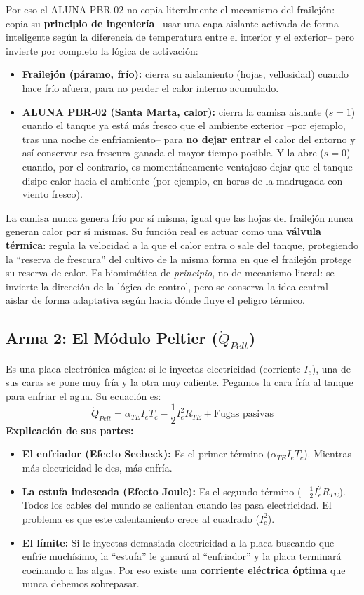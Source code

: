 \documentclass[11pt,a4paper]{article}
\begin{document}
Por eso el ALUNA PBR-02 no copia literalmente el mecanismo del frailejón: copia su \textbf{principio de ingeniería} --usar una capa aislante activada de forma inteligente según la diferencia de temperatura entre el interior y el exterior-- pero invierte por completo la lógica de activación:
\begin{itemize}
    \item \textbf{Frailejón (páramo, frío):} cierra su aislamiento (hojas, vellosidad) cuando hace frío afuera, para no perder el calor interno acumulado.
    \item \textbf{ALUNA PBR-02 (Santa Marta, calor):} cierra la camisa aislante ($s=1$) cuando el tanque ya está más fresco que el ambiente exterior --por ejemplo, tras una noche de enfriamiento-- para \textbf{no dejar entrar} el calor del entorno y así conservar esa frescura ganada el mayor tiempo posible. Y la abre ($s=0$) cuando, por el contrario, es momentáneamente ventajoso dejar que el tanque disipe calor hacia el ambiente (por ejemplo, en horas de la madrugada con viento fresco).
\end{itemize}
La camisa nunca genera frío por sí misma, igual que las hojas del frailejón nunca generan calor por sí mismas. Su función real es actuar como una \textbf{válvula térmica}: regula la velocidad a la que el calor entra o sale del tanque, protegiendo la ``reserva de frescura'' del cultivo de la misma forma en que el frailejón protege su reserva de calor. Es biomimética de \textit{principio}, no de mecanismo literal: se invierte la dirección de la lógica de control, pero se conserva la idea central --aislar de forma adaptativa según hacia dónde fluye el peligro térmico.

\subsection{Arma 2: El Módulo Peltier ($\dot{Q}_{Pelt}$)}
Es una placa electrónica mágica: si le inyectas electricidad (corriente $I_e$), una de sus caras se pone muy fría y la otra muy caliente. Pegamos la cara fría al tanque para enfriar el agua. Su ecuación es:
\begin{equation}
\dot{Q}_{Pelt} = \alpha_{TE} I_e T_c - \frac{1}{2} I_e^2 R_{TE} + \text{Fugas pasivas}
\end{equation}
\textbf{Explicación de sus partes:}
\begin{itemize}
    \item \textbf{El enfriador (Efecto Seebeck):} Es el primer término ($\alpha_{TE} I_e T_c$). Mientras más electricidad le des, más enfría.
    \item \textbf{La estufa indeseada (Efecto Joule):} Es el segundo término ($- \frac{1}{2} I_e^2 R_{TE}$). Todos los cables del mundo se calientan cuando les pasa electricidad. El problema es que este calentamiento crece al cuadrado ($I_e^2$).
    \item \textbf{El límite:} Si le inyectas demasiada electricidad a la placa buscando que enfríe muchísimo, la ``estufa'' le ganará al ``enfriador'' y la placa terminará cocinando a las algas. Por eso existe una \textbf{corriente eléctrica óptima} que nunca debemos sobrepasar.
\end{itemize}
\end{document}
